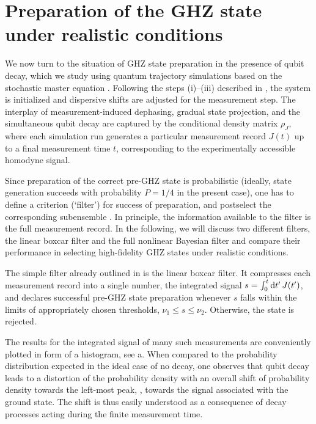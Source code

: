 \section{Preparation of the GHZ state under realistic conditions}\label{sec:generation}
We now turn to the situation of GHZ state preparation in the presence of qubit decay, which we study using
quantum trajectory simulations based on the stochastic master equation . Following the steps
(i)--(iii) described in , the system is initialized and dispersive shifts are adjusted for the measurement step. The interplay of measurement-induced dephasing, gradual state projection, and the simultaneous qubit decay are captured by the conditional density matrix $\rho_J$, where each simulation run generates a particular measurement record $J(t)$ up to a final measurement time $t$, corresponding to the
experimentally accessible homodyne signal.

Since preparation of the correct pre-GHZ state is probabilistic (ideally, state generation succeeds with probability $P=1/4$ in the present case), one has to define a criterion (`filter') for success of preparation, and postselect the corresponding subensemble \cite{gambetta_protocols_2007}. In principle, the information available to the filter is the full measurement record. In the following, we will discuss two different filters, the linear boxcar filter and the full nonlinear Bayesian filter and compare their performance in selecting high-fidelity GHZ states under realistic conditions.

The simple filter already outlined in  is the linear boxcar filter. It compresses each measurement record into a single number, the integrated signal $s=\int_0^t \mathrm{d} t'\, J(t')$, and declares successful
pre-GHZ state preparation whenever $s$ falls within the limits of appropriately chosen thresholds, $\nu_1\le
s\le\nu_2$. Otherwise, the state is rejected.

The results for the integrated signal of many such measurements are conveniently plotted in form of a histogram, see a. When compared to the probability distribution expected in the ideal case of no decay, one observes that qubit decay leads to a distortion of the probability density with an overall shift of probability density towards the left-most peak, \ie, towards the signal associated with the ground state. The shift is thus easily understood as a consequence of decay processes acting during the finite measurement time.


